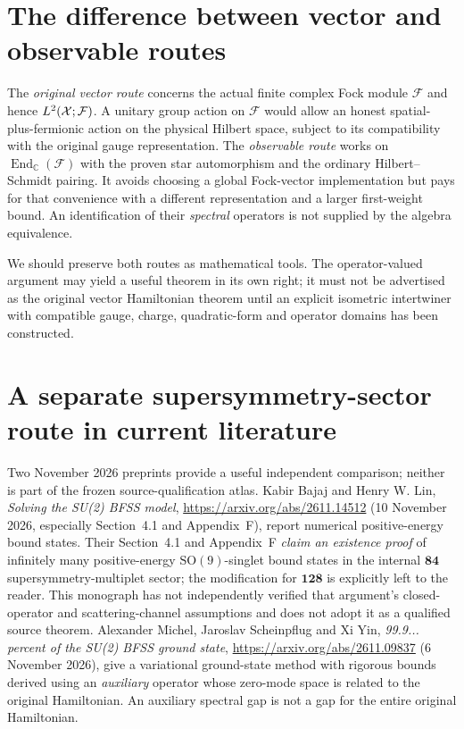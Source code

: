 \section{The difference between vector and observable routes}
The \emph{original vector route} concerns the actual finite complex
Fock module $\mathcal F$ and hence $L^2(\mathcal X;\mathcal F)$.
A unitary group action on $\mathcal F$ would allow an honest
spatial-plus-fermionic action on the physical Hilbert space, subject
to its compatibility with the original gauge representation.
The \emph{observable route} works on
$\operatorname{End}_{\mathbb C}(\mathcal F)$ with the proven
star automorphism and the ordinary Hilbert--Schmidt pairing.
It avoids choosing a global Fock-vector implementation but pays for
that convenience with a different representation and a larger
first-weight bound. An identification of their \emph{spectral}
operators is not supplied by the algebra equivalence.

We should preserve both routes as mathematical tools. The
operator-valued argument may yield a useful theorem in its own right;
it must not be advertised as the original vector Hamiltonian theorem
until an explicit isometric intertwiner with compatible gauge,
charge, quadratic-form and operator domains has been constructed.

\section{A separate supersymmetry-sector route in current literature}
Two November 2026 preprints provide a useful independent comparison;
neither is part of the frozen source-qualification atlas.
Kabir Bajaj and Henry W. Lin,
\emph{Solving the SU(2) BFSS model},
\url{https://arxiv.org/abs/2611.14512} (10 November 2026,
especially Section~4.1 and Appendix~F), report numerical
positive-energy bound states. Their Section~4.1 and Appendix~F
\emph{claim an existence proof} of infinitely many positive-energy
\(\mathrm{SO}(9)\)-singlet bound states in the internal
\(\mathbf{84}\) supersymmetry-multiplet sector; the modification
for \(\mathbf{128}\) is explicitly left to the reader. This
monograph has not independently verified that argument's closed-operator
and scattering-channel assumptions and does not adopt it as a qualified
source theorem. Alexander Michel,
Jaroslav Scheinpflug and Xi Yin,
\emph{99.9... percent of the SU(2) BFSS ground state},
\url{https://arxiv.org/abs/2611.09837} (6 November 2026),
give a variational ground-state method with rigorous bounds
derived using an \emph{auxiliary} operator whose zero-mode
space is related to the original Hamiltonian. An auxiliary
spectral gap is not a gap for the entire original Hamiltonian.

